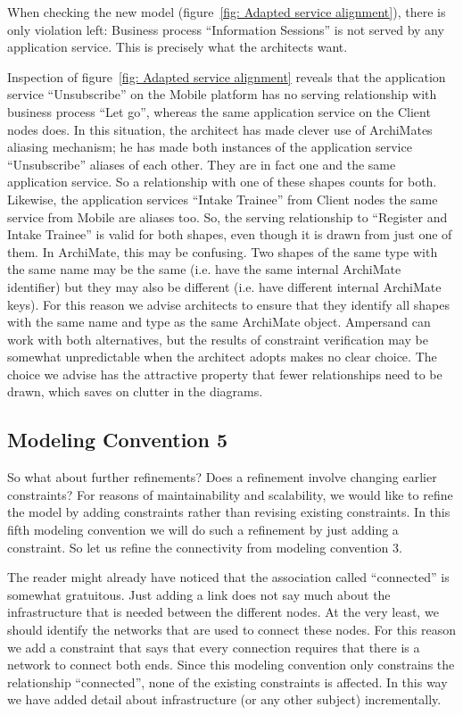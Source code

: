 \documentclass[sn-vancouver]{sn-jnl}%
\begin{document}
When checking the new model (figure~\ref{fig: Adapted service alignment}), there is only violation left:
Business process ``Information Sessions'' is not served by any application service.
This is precisely what the architects want.

Inspection of figure~\ref{fig: Adapted service alignment} reveals that
the application service ``Unsubscribe'' on the Mobile platform has no serving relationship with business process ``Let go'',
whereas the same application service on the Client nodes does.
In this situation, the architect has made clever use of ArchiMates aliasing mechanism;
he has made both instances of the application service ``Unsubscribe'' aliases of each other.
They are in fact one and the same application service.
So a relationship with one of these shapes counts for both.
Likewise, the application services ``Intake Trainee'' from Client nodes the same service from Mobile are aliases too.
So, the serving relationship to ``Register and Intake Trainee'' is valid for both shapes,
even though it is drawn from just one of them.
In ArchiMate, this may be confusing.
Two shapes of the same type with the same name may be the same (i.e. have the same internal ArchiMate identifier)
but they may also be different (i.e. have different internal ArchiMate keys).
For this reason we advise architects to ensure that they identify all shapes with the same name and type as the same ArchiMate object.
Ampersand can work with both alternatives, but the results of constraint verification may be somewhat unpredictable when the architect
adopts makes no clear choice.
The choice we advise has the attractive property that fewer relationships need to be drawn, which saves on clutter in the diagrams.

\subsection{Modeling Convention 5}\label{Modeling Convention 5}
So what about further refinements? Does a refinement involve changing earlier constraints?
For reasons of maintainability and scalability, we would like to refine the model by adding constraints rather than revising existing constraints.
In this fifth modeling convention we will do such a refinement by just adding a constraint.
So let us refine the connectivity from modeling convention 3.

The reader might already have noticed that the association called ``connected'' is somewhat gratuitous.
Just adding a link does not say much about the infrastructure that is needed between the different nodes.
At the very least, we should identify the networks that are used to connect these nodes.
For this reason we add a constraint that says that every connection requires that there is a network to connect both ends.
Since this modeling convention only constrains the relationship ``connected'',
none of the existing constraints is affected.
In this way we have added detail about infrastructure (or any other subject) incrementally.
\end{document}
